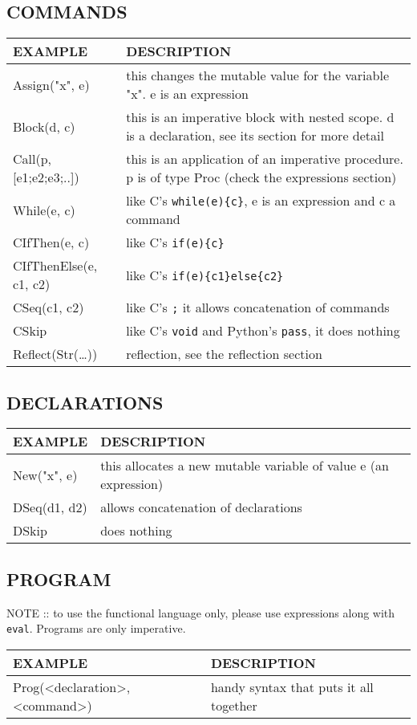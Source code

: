 \documentclass[11pt]{article}
\begin{document}
\subsection{COMMANDS}
\label{sec:org9c3e8af}
\begin{center}
\begin{tabularx}{\textwidth}{lX}
EXAMPLE & DESCRIPTION\\
\hline
Assign("x", e) & this changes the mutable value for the variable "x". e is an expression\\
Block(d, c) & this is an imperative block with nested scope. d is a declaration, see its section for more detail\\
Call(p, [e1;e2;e3;..]) & this is an application of an imperative procedure. p is of type Proc (check the expressions section)\\
While(e, c) & like C's \texttt{while(e)\{c\}}, e is an expression and c a command\\
CIfThen(e, c) & like C's \texttt{if(e)\{c\}}\\
CIfThenElse(e, c1, c2) & like C's \texttt{if(e)\{c1\}else\{c2\}}\\
CSeq(c1, c2) & like C's \texttt{;} it allows concatenation of commands\\
CSkip & like C's \texttt{void} and Python's \texttt{pass}, it does nothing\\
Reflect(Str(\ldots{})) & reflection, see the reflection section\\
\end{tabularx}
\end{center}
\subsection{DECLARATIONS}
\label{sec:org677b58f}
\begin{center}
\begin{tabularx}{\textwidth}{lX}
EXAMPLE & DESCRIPTION\\
\hline
New("x", e) & this allocates a new mutable variable of value e (an expression)\\
DSeq(d1, d2) & allows concatenation of declarations\\
DSkip & does nothing\\
\end{tabularx}
\end{center}
\subsection{PROGRAM}
\label{sec:orgf8fb6f2}
NOTE :: to use the functional language only, please use expressions along with \texttt{eval}. Programs are only imperative.
\begin{center}
\begin{tabularx}{\textwidth}{ll}
EXAMPLE & DESCRIPTION\\
\hline
Prog(<declaration>, <command>) & handy syntax that puts it all together\\
\end{tabularx}
\end{center}
\end{document}
